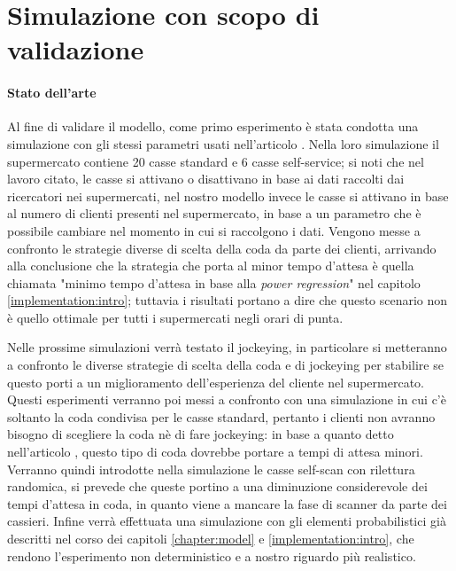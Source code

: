 \section{Simulazione con scopo di validazione}

\paragraph{Stato dell'arte}

Al fine di validare il modello, come primo esperimento è stata condotta una simulazione con gli stessi parametri usati nell'articolo \cite{article1}. Nella loro simulazione il supermercato contiene 20 casse standard e 6 casse self-service; si noti che nel lavoro citato, le casse si attivano o disattivano in base ai dati raccolti dai ricercatori nei supermercati, nel nostro modello invece le casse si attivano in base al numero di clienti presenti nel supermercato, in base a un parametro che è possibile cambiare nel momento in cui si raccolgono i dati. Vengono messe a confronto le strategie diverse di scelta della coda da parte dei clienti, arrivando alla conclusione che la strategia che porta al minor tempo d'attesa è quella chiamata "minimo tempo d'attesa in base alla \textit{power regression}" nel capitolo \ref{implementation:intro}; tuttavia i risultati portano a dire che questo scenario non è quello ottimale per tutti i supermercati negli orari di punta.

Nelle prossime simulazioni verrà testato il jockeying, in particolare si metteranno a confronto le diverse strategie di scelta della coda e di jockeying per stabilire se questo porti a un miglioramento dell'esperienza del cliente nel supermercato. Questi esperimenti verranno poi messi a confronto con una simulazione in cui c'è soltanto la coda condivisa per le casse standard, pertanto i clienti non avranno bisogno di scegliere la coda nè di fare jockeying: in base a quanto detto nell'articolo \cite{yanagisawa2011methods}, questo tipo di coda dovrebbe portare a tempi di attesa minori. 
Verranno quindi introdotte nella simulazione le casse self-scan con rilettura randomica, si prevede che queste portino a una diminuzione considerevole dei tempi d'attesa in coda, in quanto viene a mancare la fase di scanner da parte dei cassieri. Infine verrà effettuata una simulazione con gli elementi probabilistici già descritti nel corso dei capitoli \ref{chapter:model} e \ref{implementation:intro}, che rendono l'esperimento non deterministico e a nostro riguardo più realistico.

